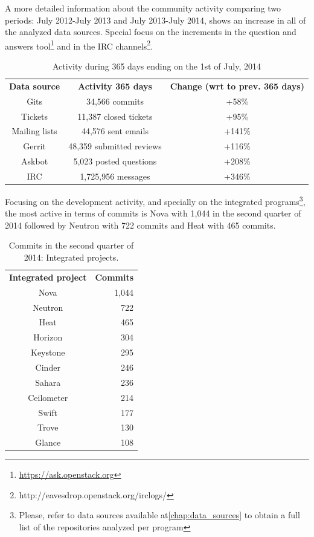 \documentclass[a4wide,11pt]{report}
\begin{document}
A more detailed information about the community activity comparing two periods: July 2012-July 2013 and July 2013-July 2014, shows an increase in all of the analyzed data sources. Special focus on the increments in the question and answers tool\footnote{\url{https://ask.openstack.org}} and in the IRC channels\footnote{http://eavesdrop.openstack.org/irclogs/}.

\begin{center}
\begin{table}[H]
\begin{tabular}{ c|c|c| } 

\textbf{Data source} & \textbf{Activity 365 days} & \textbf{Change (wrt to prev. 365 days)} \\

 Gits    & 34,566 commits & +58\% \\ 
 Tickets & 11,387 closed tickets & +95\% \\
 Mailing lists & 44,576 sent emails & +141\% \\ 
 Gerrit  & 48,359 submitted reviews & +116\% \\ 
 Askbot & 5,023 posted questions & +208\% \\ 
 IRC & 1,725,956 messages & +346\% \\
\end{tabular}
\caption{Activity during 365 days ending on the 1st of July, 2014}
\end{table}
\end{center}

Focusing on the development activity, and specially on the integrated programs\footnote{Please, refer to data sources available at\ref{chap:data_sources} to obtain a full list of the repositories analyzed per program},
the most active in terms of commits is Nova with 1,044 in the second quarter of 2014 followed by Neutron with 722 commits and Heat with 465 commits.


\begin{table}[H]
\centering
\begin{tabular}{c|r|} 

\textbf{Integrated project} & \textbf{Commits} \\
Nova & 1,044\\
Neutron & 722\\
Heat & 465\\
Horizon & 304\\
Keystone & 295\\
Cinder & 246\\
Sahara & 236\\
Ceilometer & 214\\
Swift & 177\\
Trove & 130\\
Glance & 108\\
\end{tabular}
\caption{Commits in the second quarter of 2014: Integrated projects.}
\end{table}
\end{document}

